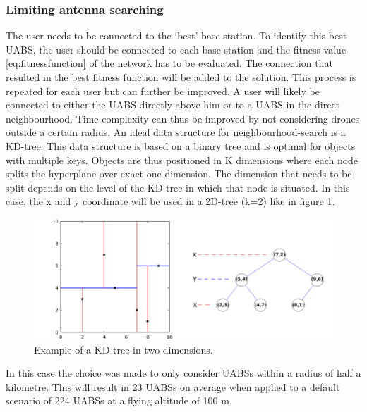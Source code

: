 \subsubsection{Limiting antenna searching}
The user needs to be connected to the `best' base station. To identify this best \gls{UABS}, the user should be connected 
to each base station and the fitness value \ref{eq:fitnessfunction} of the network has to be evaluated. The connection that resulted in the best fitness function
will be added to the solution. This process is repeated for each user but can further be improved. A user will likely be connected to either the
\gls{UABS} directly above him or to a \gls{UABS} in the direct neighbourhood. Time complexity can thus be improved by not considering drones 
outside a certain radius.
An ideal data structure for neighbourhood-search is a KD-tree. This data structure is based on a binary tree and is optimal for objects with 
multiple keys. Objects are thus positioned in K dimensions where each node splits the hyperplane over exact one dimension. The dimension that needs 
to be split depends on the level of the KD-tree in which that node is situated.
In this case, the x and y coordinate will be used in a 2D-tree (k=2) like in figure \ref{fig:exampleKDtree}.

\begin{figure}[H]
  \includegraphics[width=\textwidth]{../images/Example-of-a-2D-k-d-tree.png}
  \caption{Example of a KD-tree in two dimensions.}
  \label{fig:exampleKDtree}
\end{figure}

In this case the choice was made to only consider \gls{UABS}s within a radius of half a kilometre. 
This will result in 23 \gls{UABS}s on average when applied to a default scenario of 224 \gls{UABS}s at a flying altitude of 100 m.